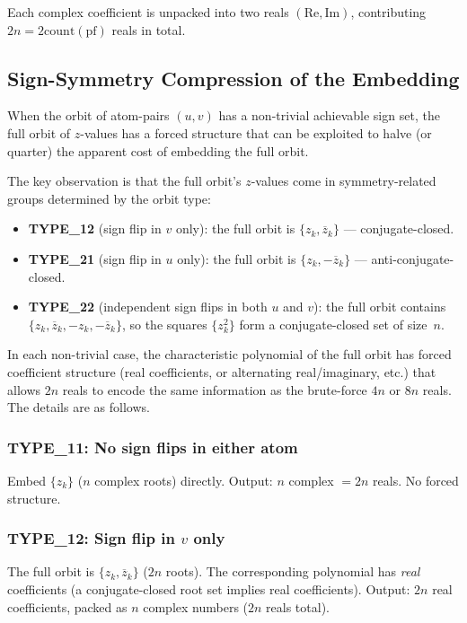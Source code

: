 \documentclass[11pt,a4paper]{article}
\theoremstyle{definition}
\theoremstyle{plain}
\theoremstyle{remark}
\newcommand{\pf}{\mathrm{pf}}
\newcommand{\acount}{\mathrm{count}}
\begin{document}
Each complex coefficient is unpacked into two reals $(\mathrm{Re}, \mathrm{Im})$,
contributing $2n = 2\acount(\pf)$ reals in total.

\subsection{Sign-Symmetry Compression of the Embedding}
\label{sec:5a}

When the orbit of atom-pairs $(u, v)$ has a non-trivial achievable sign set,
the full orbit of $z$-values has a forced structure that can be exploited to
halve (or quarter) the apparent cost of embedding the full orbit.

The key observation is that the full orbit's $z$-values come in
symmetry-related groups determined by the orbit type:
\begin{itemize}
  \item \textbf{TYPE\_12} (sign flip in $v$ only):
    the full orbit is $\{z_k, \overline{z}_k\}$ — conjugate-closed.
  \item \textbf{TYPE\_21} (sign flip in $u$ only):
    the full orbit is $\{z_k, -\overline{z}_k\}$ — anti-conjugate-closed.
  \item \textbf{TYPE\_22} (independent sign flips in both $u$ and $v$):
    the full orbit contains $\{z_k, \overline{z}_k, -z_k, -\overline{z}_k\}$,
    so the squares $\{z_k^2\}$ form a conjugate-closed set of size~$n$.
\end{itemize}

In each non-trivial case, the characteristic polynomial of the full orbit
has forced coefficient structure (real coefficients, or alternating
real/imaginary, etc.) that allows $2n$ reals to encode the same information as
the brute-force $4n$ or $8n$ reals.  The details are as follows.

\subsubsection{TYPE\_11: No sign flips in either atom}
Embed $\{z_k\}$ ($n$ complex roots) directly.  Output: $n$ complex
$= 2n$ reals.  No forced structure.

\subsubsection{TYPE\_12: Sign flip in $v$ only}
The full orbit is $\{z_k, \overline{z}_k\}$ ($2n$ roots).  The corresponding
polynomial has \emph{real} coefficients (a conjugate-closed root set implies
real coefficients).  Output: $2n$ real coefficients, packed as $n$ complex
numbers ($2n$ reals total).
\end{document}
